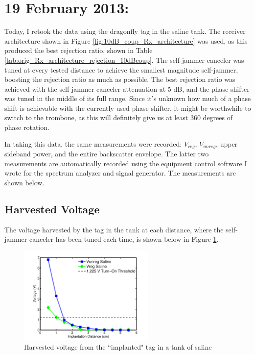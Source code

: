 \documentclass[12pt,onecolumn,titlepage]{article}
\begin{document}
\section{19 February 2013:}

\indent \indent Today, I retook the data using the dragonfly tag in the saline tank. The receiver architecture shown in Figure \ref{fig:10dB_coup_Rx_architecture} was used, as this produced the best rejection ratio, shown in Table \ref{tab:orig_Rx_architecture_rejection_10dBcoup}. The self-jammer canceler was tuned at every tested distance to achieve the smallest magnitude self-jammer, boosting the rejection ratio as much as possible. The best rejection ratio was achieved with the self-jammer canceler attenuation at 5 dB, and the phase shifter was tuned in the middle of its full range. Since it's unknown how much of a phase shift is achievable with the currently used phase shifter, it might be worthwhile to switch to the trombone, as this will definitely give us at least 360 degrees of phase rotation.

In taking this data, the same measurements were recorded: $V_{reg}$, $V_{unreg}$, upper sideband power, and the entire backscatter envelope. The latter two measurements are automatically recorded using the equipment control software I wrote for the spectrum analyzer and signal generator. The measurements are shown below.

\subsection{Harvested Voltage}
\indent \indent The voltage harvested by the tag in the tank at each distance, where the self-jammer canceler has been tuned each time, is shown below in Figure \ref{fig:VHarvest_small_oct_loop_retune}.

\begin{figure}[h]
	\centering
	\includegraphics[width=0.6\textwidth]{Pictures/19Feb2013/VHarvest_small_oct_loop_retune}
	\caption{Harvested voltage from the ``implanted" tag in a tank of saline}
	\label{fig:VHarvest_small_oct_loop_retune}
\end{figure}
\end{document}
